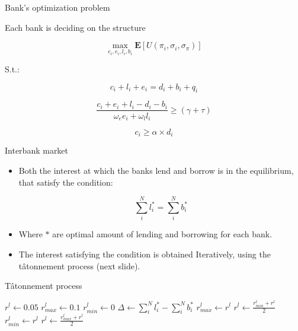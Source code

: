 \documentclass{beamer}
\begin{document}
\begin{frame}{Bank's optimization problem}

    Each bank is deciding on the structure 

    \[\max_{c_i, e_i, l_i, b_i} \mathbf{E}[U(\pi_i, \sigma_i, \sigma_\pi)]\]

    S.t.:

    \[c_i + l_i + e_i = d_i + b_i + q_i\]

    \[\frac{c_i + e_i + l_i - d_i - b_i}{\omega_e e_i + \omega_l l_i} \geq (\gamma + \tau)\]
    
    \[c_i \geq \alpha \times d_i\]
        
\end{frame}

\begin{frame}{Interbank market}
    
    \begin{itemize}
        \item Both the interest at which the banks lend and borrow is in the equilibrium, that satisfy the condition:
        
        \[\sum_{i}^{N} l_i^* = \sum_{i}^{N} b_i^*\]
        
        \item Where $*$ are optimal amount of lending and borrowing for each bank.
        
        \item The interest satisfying the condition is obtained Iteratively, using the tâtonnement process (next slide). 
    \end{itemize}

\end{frame}

\begin{frame}{Tâtonnement process}
    
    \begin{algorithm}[H]
        \caption{tatonnement process}\label{alg:cap}
        \begin{algorithmic}
        \State $r^l \gets 0.05$
        \State $r^l_{max} \gets 0.1$
        \State $r^l_{min} \gets 0$
        \State $\Delta \gets \sum_{i}^{N} l_i^* - \sum_{i}^{N} b_i^*$
            \State $r^l_{max} \gets r^l$
            \State $r^l \gets \frac{r^l_{min} + r^l}{2}$
            \State $r^l_{min} \gets r^l$
            \State $r^l \gets \frac{r^l_{max} + r^l}{2}$
        \EndIf
        \EndWhile
        \end{algorithmic}
    \end{algorithm}

\end{frame}
\end{document}
